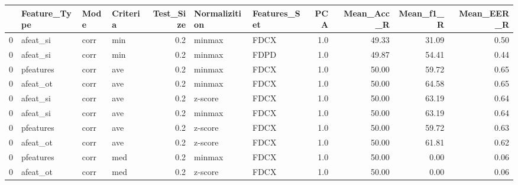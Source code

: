 \begin{tabular}{llllrllrrrr}
\toprule
{} & Feature\_Type &  Mode & Criteria &  Test\_Size & Normalizition & Features\_Set &  PCA &  Mean\_Acc\_R &  Mean\_f1\_R &  Mean\_EER\_R \\
\midrule
0 &     afeat\_si &  corr &      min &        0.2 &        minmax &         FDCX &  1.0 &       49.33 &      31.09 &        0.50 \\
0 &     afeat\_si &  corr &      min &        0.2 &        minmax &         FDPD &  1.0 &       49.87 &      54.41 &        0.44 \\
0 &    pfeatures &  corr &      ave &        0.2 &        minmax &         FDCX &  1.0 &       50.00 &      59.72 &        0.65 \\
0 &     afeat\_ot &  corr &      ave &        0.2 &        minmax &         FDCX &  1.0 &       50.00 &      64.58 &        0.65 \\
0 &     afeat\_si &  corr &      ave &        0.2 &       z-score &         FDCX &  1.0 &       50.00 &      63.19 &        0.64 \\
0 &     afeat\_si &  corr &      ave &        0.2 &        minmax &         FDCX &  1.0 &       50.00 &      63.19 &        0.64 \\
0 &    pfeatures &  corr &      ave &        0.2 &       z-score &         FDCX &  1.0 &       50.00 &      59.72 &        0.63 \\
0 &     afeat\_ot &  corr &      ave &        0.2 &       z-score &         FDCX &  1.0 &       50.00 &      61.81 &        0.62 \\
0 &    pfeatures &  corr &      med &        0.2 &        minmax &         FDCX &  1.0 &       50.00 &       0.00 &        0.06 \\
0 &     afeat\_ot &  corr &      med &        0.2 &       z-score &         FDCX &  1.0 &       50.00 &       0.00 &        0.06 \\
\bottomrule
\end{tabular}
